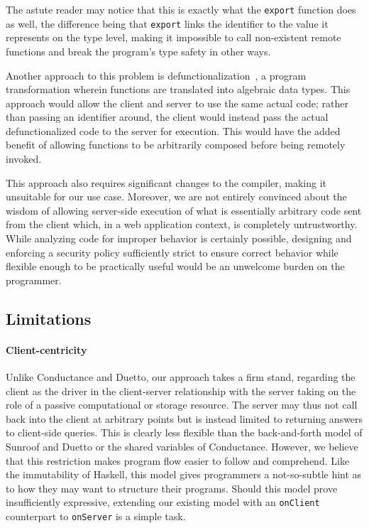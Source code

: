 \documentclass[preprint]{sigplanconf}
\begin{document}
The astute reader may notice that this is exactly what the \lstinline!export!
function does as well, the difference being that \lstinline!export! links the
identifier to the value it represents on the type level, making it impossible
to call non-existent remote functions and break the program's type safety in
other ways.

Another approach to this problem is
defunctionalization\ \cite{defunctionalization}, a program transformation
wherein functions are translated into algebraic data types. This approach would
allow the client and server to use the same actual code; rather than passing
an identifier around, the client would instead pass the actual defunctionalized
code to the server for execution. This would have the added benefit of allowing
functions to be arbitrarily composed before being remotely invoked.

This approach also requires significant changes to the compiler, making it
unsuitable for our use case. Moreover, we are not entirely convinced about the
wisdom of allowing server-side execution of what is essentially arbitrary code
sent from the client which, in a web application context, is completely
untrustworthy. While analyzing code for improper behavior is certainly
possible, designing and enforcing a security policy sufficiently strict to
ensure correct behavior while flexible enough to be practically useful would be
an unwelcome burden on the programmer.

\subsection{Limitations}
\label{sec:limitations}

\paragraph{Client-centricity} Unlike Conductance and Duetto, our approach
takes a firm stand, regarding the client as the driver in the client-server
relationship with the server taking on the role of a passive computational
or storage resource. The server may thus not call back into the client at
arbitrary points but is instead limited to returning answers to client-side
queries. This is clearly less flexible than the back-and-forth model of Sunroof
and Duetto or the shared variables of Conductance. However, we believe that
this restriction makes program flow easier to follow and comprehend. Like the
immutability of Haskell, this model gives programmers a not-so-subtle hint
as to how they may want to structure their programs. Should this model prove
insufficiently expressive, extending our existing model with an
\lstinline!onClient! counterpart to \lstinline!onServer! is a simple task.
\end{document}
